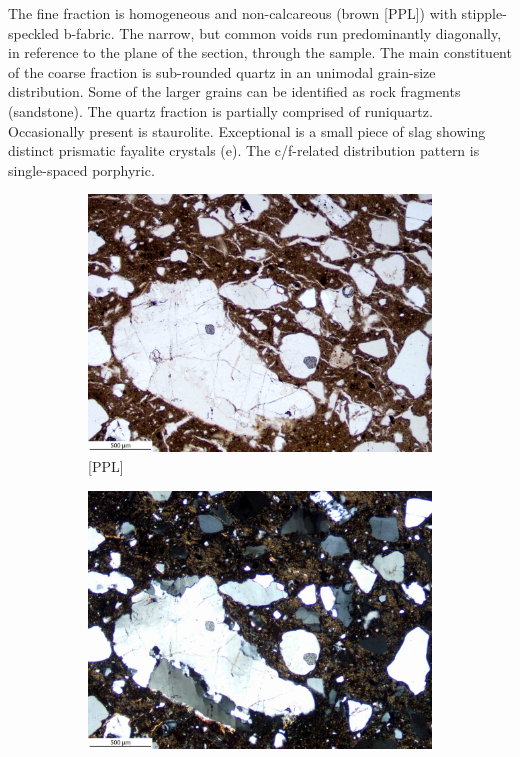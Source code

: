 \documentclass[a4paper]{article}
\begin{document}
\begin{multicols}{2}
\noindent The fine fraction is homogeneous and non-calcareous (brown [PPL]) with stipple-speckled b-fabric. The narrow, but common voids run predominantly diagonally, in reference to the plane of the section, through the sample. The main constituent of the coarse fraction is sub-rounded quartz in an unimodal grain-size distribution. Some of the larger grains can be identified as rock fragments (sandstone). The quartz fraction is partially comprised of runiquartz. Occasionally present is staurolite. Exceptional is a small piece of slag showing distinct prismatic fayalite crystals (e). The c/f-related distribution pattern is single-spaced porphyric.
\end{multicols}

\begin{figure}[H]
	\centering
	\begin{subfigure}[t]{.49\textwidth}
		\includegraphics[width=\textwidth]{ThinSections/97-1_4x_PPL.jpg}
		\caption{[PPL]}
	\end{subfigure}\hspace{.5em}\hfill
	\begin{subfigure}[t]{.49\textwidth}
		\includegraphics[width=\textwidth]{ThinSections/97-1_4x_XPL.jpg}

\end{subfigure}
\end{figure}
\end{document}
